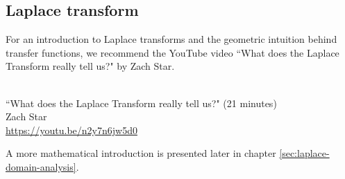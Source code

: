 \subsection{Laplace transform}

For an introduction to Laplace transforms and the geometric intuition behind
transfer functions, we recommend the YouTube video ``What does the Laplace
Transform really tell us?" by Zach Star.
\begin{bookfigure}
   \\
  ``What does the Laplace Transform really tell us?" (21 minutes) \\
  \footnotesize Zach Star \\
  \url{https://youtu.be/n2y7n6jw5d0}
\end{bookfigure}

A more mathematical introduction is presented later in chapter
\ref{sec:laplace-domain-analysis}.
